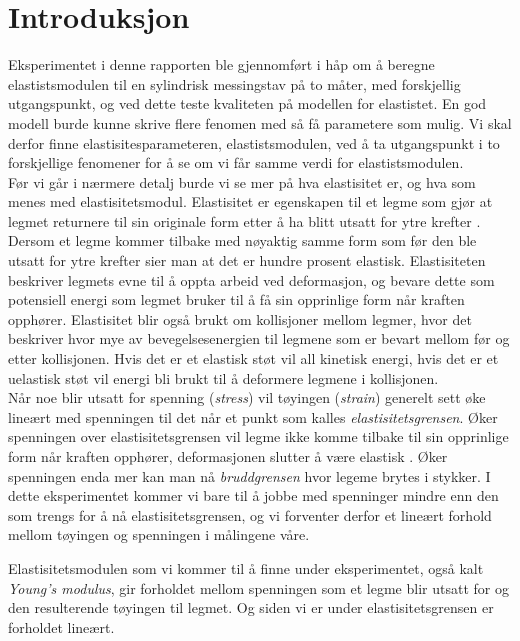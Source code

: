 \documentclass[%
 reprint,
 amsmath,amssymb,
 aps,
 norsk,
 booktabs
]{revtex4-1}
\begin{document}
\section{Introduksjon}
Eksperimentet i denne rapporten ble gjennomført i håp om å beregne elastistsmodulen til en sylindrisk messingstav på to måter, med forskjellig utgangspunkt, og ved dette teste kvaliteten på modellen for elastistet. En god modell burde kunne skrive flere fenomen med så få parametere som mulig. Vi skal derfor finne elastisitesparameteren, elastistsmodulen, ved å ta utgangspunkt i to forskjellige fenomener for å se om vi får samme verdi for elastistsmodulen.\\
Før vi går i nærmere detalj burde vi se mer på hva elastisitet er, og hva som menes med elastisitetsmodul. Elastisitet er egenskapen til et legme som gjør at legmet returnere til sin originale form etter å ha blitt utsatt  for ytre krefter \cite{gronn}. Dersom et legme kommer tilbake med nøyaktig samme form som før den ble utsatt for ytre krefter sier man at det er hundre prosent elastisk. Elastisiteten beskriver legmets evne til å oppta arbeid ved deformasjon, og bevare dette som potensiell energi som legmet bruker til å få sin opprinlige form når kraften opphører. Elastisitet blir også brukt om kollisjoner mellom legmer, hvor det beskriver hvor mye av bevegelsesenergien til legmene som er bevart mellom før og etter kollisjonen. Hvis det er et elastisk støt vil all kinetisk energi, hvis det er et uelastisk støt vil energi bli brukt til å deformere legmene i kollisjonen.\\

Når noe blir utsatt for spenning (\textit{stress}) vil tøyingen (\textit{strain}) generelt sett øke lineært med spenningen til det når et punkt som kalles \textit{elastisitetsgrensen}. Øker spenningen over elastisitetsgrensen vil legme ikke komme tilbake til sin opprinlige form når kraften opphører, deformasjonen slutter å være elastisk  \cite{gronn}. Øker spenningen enda mer kan man nå \textit{bruddgrensen} hvor legeme brytes i stykker. I dette eksperimentet kommer vi bare til å jobbe med spenninger mindre enn den som trengs for å nå elastisitetsgrensen, og vi forventer derfor et lineært forhold mellom tøyingen og spenningen i målingene våre.

Elastisitetsmodulen som vi kommer til å finne under eksperimentet, også kalt \textit{Young's modulus}, gir forholdet mellom spenningen som et legme blir utsatt for og den resulterende tøyingen til legmet. Og siden vi er under elastisitetsgrensen er forholdet lineært.
\end{document}
